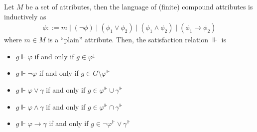 \clearpage
\begin{definition}
	\label{definition:compound-attributes-2} Let $M$ be a set of attributes, then the language of (finite) compound
	attributes is inductively as
	\begin{align}
		\phi ::= m \mid (\neg \phi) \mid (\phi_{1}\lor \phi_{2}) \mid (\phi_{1}\land \phi_{2}) \mid (\phi_{1}\rightarrow \phi_{2})
	\end{align}
	where $m \in M$ is a ``plain'' attribute. Then, the satisfaction relation $\Vdash$ is

	\begin{itemize}
		\item $g \Vdash \varphi$ if and only if $g \in \varphi^{\downarrow}$

		\item $g \Vdash \neg \varphi$ if and only if $g \in G \setminus \varphi^{\Vdash}$

		\item $g \Vdash \varphi \lor \gamma$ if and only if $g \in \varphi^{\Vdash}\cup \gamma^{\Vdash}$

		\item $g \Vdash \varphi \land \gamma$ if and only if $g \in \varphi^{\Vdash}\cap \gamma^{\Vdash}$

		\item $g \Vdash \varphi \rightarrow \gamma$ if and only if $g \in \neg \varphi^{\Vdash}\lor \gamma^{\Vdash}$
	\end{itemize}
\end{definition}
